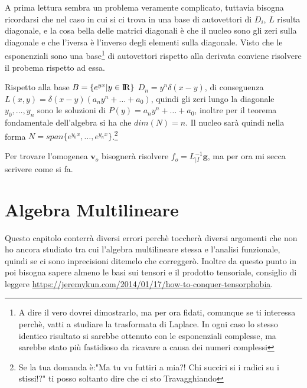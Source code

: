 \documentclass[11pt,a4paper]{report}
\newcommand{\vettore}[1]{\mathbf{#1}}
\theoremstyle{definition}
\theoremstyle{plain}
\theoremstyle{plain}
\begin{document}
			A prima lettura sembra un problema veramente complicato, tuttavia bisogna ricordarsi che nel caso in cui si ci trova in una base di autovettori di $D_i$, $L$ risulta diagonale, e la cosa bella delle matrici diagonali è che il nucleo sono gli zeri sulla diagonale e che l'iversa è l'inverso degli elementi sulla diagonale.\newline
			Visto che le esponenziali sono una base\footnote{A dire il vero dovrei dimostrarlo, ma per ora fidati, comunque se ti interessa perchè, vatti a studiare la trasformata di Laplace. In ogni caso lo stesso identico risultato si sarebbe ottenuto con le esponenziali complesse, ma sarebbe stato più fastidioso da ricavare a causa dei numeri complessi} di autovettori rispetto alla derivata conviene risolvere il probema rispetto ad essa.\newline

			Rispetto alla base $B=\{e^{yx}|y \in \rm I\!R\}$ $D_n=y^n\delta(x-y)$, di conseguenza $L(x,y)=\delta(x-y)(a_ny^n+\dots+a_0)$, quindi gli zeri lungo la diagonale $y_0,\dots,y_n$ sono le soluzioni di $P(y)=a_ny^n+\dots+a_0$, inoltre per il teorema fondamentale dell'algebra si ha che $dim(N)=n$. Il nucleo sarà quindi nella forma $N=span\{e^{y_0x},\dots,e^{y_nx}\}$.\footnote{Se la tua domanda è:"Ma tu vu futtiri a mia?! Chi succiri si i radici su i stissi!?" ti posso soltanto dire che ci sto Travagghiando}\newline

			Per trovare l'omogenea $\vettore v_o$ bisognerà risolvere $f_o=L^{-1}_{|I}\vettore g$, ma per ora mi secca scrivere come si fa.










	\chapter{Algebra Multilineare}

		Questo capitolo conterrà diversi errori perchè toccherà diversi argomenti che non ho ancora studiato tra cui l'algebra multilineare stessa e l'analisi funzionale, quindi se ci sono inprecisioni ditemelo che correggerò.\newline
		Inoltre da questo punto in poi bisogna sapere almeno le basi sui tensori e il prodotto tensoriale, consiglio di leggere \href{url}{https://jeremykun.com/2014/01/17/how-to-conquer-tensorphobia}.
\end{document}
